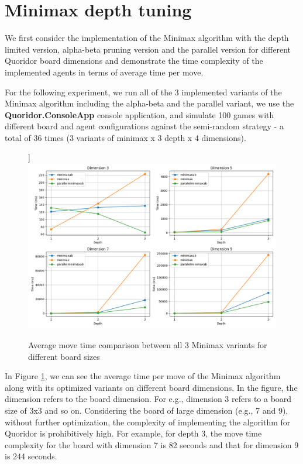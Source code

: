 \section{Minimax depth tuning}

We first consider the implementation of the Minimax algorithm with the depth limited version, alpha-beta pruning version and the parallel version for different Quoridor board dimensions and demonstrate the time complexity of the implemented agents in terms of average time per move. 

For the following experiment, we run all of the 3 implemented variants of the Minimax algorithm including the alpha-beta and the parallel variant, we use the \textbf{Quoridor.ConsoleApp} console application, and simulate 100 games with different board and agent configurations against the semi-random strategy - a total of 36 times (3 variants of minimax x 3 depth x 4 dimensions).

\begin{figure}[!ht]
]
    \centering
    \includegraphics[width=\linewidth]{../img/performance.png}
    \caption{Average move time comparison between all 3 Minimax variants for different board sizes}
    \label{fig:minimax_performance_comp}
\end{figure}

In Figure \ref{fig:minimax_performance_comp}, we can see the average time per move of the Minimax algorithm along with its optimized variants on different board dimensions. In the figure, the dimension refers to the board dimension. For e.g., dimension 3 refers to a board size of 3x3 and so on. Considering the board of large dimension (e.g., 7 and 9), without further optimization, the complexity of implementing the algorithm for Quoridor is prohibitively high. For example, for depth 3, the move time complexity for the board with dimension 7 is 82 seconds and that for dimension 9 is 244 seconds.

